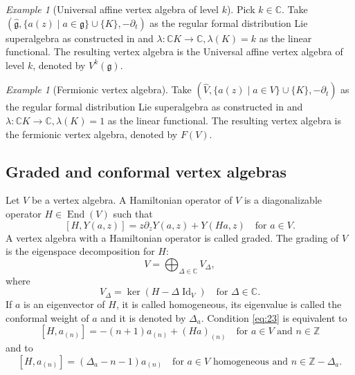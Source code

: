 \documentclass[a4paper, 12pt, reqno]{amsart}
\theoremstyle{remark}
\newtheorem{example}[theorem]{Example}
\numberwithin{equation}{subsection}
\DeclareMathOperator{\Id}{Id}
\DeclareMathOperator{\End}{End}
\begin{document}
\begin{example}[Universal affine vertex algebra of level $k$]
  \label{exa:6}
  Pick $k \in \mathbb{C}$.
  Take $(\hat{\mathfrak{g}}, \{a(z) \mid a \in \mathfrak{g}\} \cup \{K\}, -\partial_t)$ as the regular formal distribution Lie superalgebra as constructed in  and $\lambda: \mathbb{C}K \to \mathbb{C}, \lambda(K) = k$ as the linear functional.
  The resulting vertex algebra is the Universal affine vertex algebra of level $k$, denoted by $V^k(\mathfrak{g})$.
\end{example}

\begin{example}[Fermionic vertex algebra]
  \label{exa:7}
  Take $(\widehat{V}, \{a(z) \mid a \in V\} \cup \{K\}, -\partial_t)$ as the regular formal distribution Lie superalgebra as constructed in  and $\lambda: \mathbb{C}K \to \mathbb{C}, \lambda(K) = 1$ as the linear functional.
  The resulting vertex algebra is the fermionic vertex algebra, denoted by $F(V)$.
\end{example}

\subsection{Graded and conformal vertex algebras}
\label{sec:grad-conf-vert}

Let $V$ be a vertex algebra.
A Hamiltonian operator of $V$ is a diagonalizable operator $H \in \End(V)$ such that
\begin{equation}
  \label{eq:23}
  [H, Y(a, z)] = z\partial_zY(a, z) + Y(Ha, z) \quad \text{for }a \in V.
\end{equation}
A vertex algebra with a Hamiltonian operator is called graded.
The grading of $V$ is the eigenspace decomposition for $H$:
\begin{equation*}
  V = \bigoplus_{\Delta \in \mathbb{C}}V_{\Delta},
\end{equation*}
where
\begin{equation*}
  V_{\Delta} = \ker(H - \Delta\Id_V) \quad \text{for }\Delta \in \mathbb{C}.
\end{equation*}
If $a$ is an eigenvector of $H$, it is called homogeneous, its eigenvalue is called the conformal weight of $a$ and it is denoted by $\Delta_a$.
Condition \eqref{eq:23} is equivalent to
\begin{equation}
  \label{eq:24}
  [H,a_{(n)}] = -(n + 1)a_{(n)} + (Ha)_{(n)} \quad \text{for }a \in V\text{ and }n \in \mathbb{Z}
\end{equation}
and to
\begin{equation}
  \label{eq:25}
  [H, a_{(n)}] = (\Delta_a - n - 1)a_{(n)} \quad \text{for }a \in V\text{ homogeneous and }n \in \mathbb{Z} - \Delta_a.
\end{equation}
\end{document}
